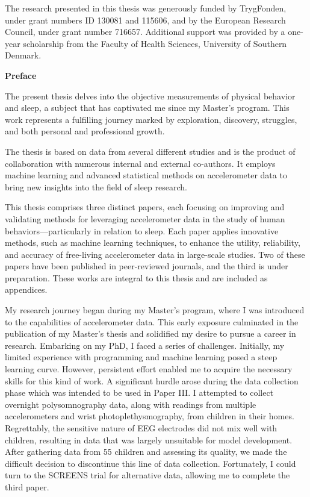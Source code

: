\documentclass[
  10pt,
]{scrbook}
\let\originaltextbf\textbf
\renewcommand{\textbf}[1]{\textcolor{color1}{\textsf{\originaltextbf{#1}}}}
\begin{document}
\vspace*{\baselineskip}

The research presented in this thesis was generously funded by TrygFonden, under grant numbers ID 130081 and 115606, and by the European Research Council, under grant number 716657. Additional support was provided by a one-year scholarship from the Faculty of Health Sciences, University of Southern Denmark.

\newpage

  
\textcolor{color1}{\textsf{\textbf{\Large{Preface}}}}

\vspace*{\baselineskip}

The present thesis delves into the objective measurements of physical behavior and sleep, a subject that has captivated me since my Master's program. This work represents a fulfilling journey marked by exploration, discovery, struggles, and both personal and professional growth.

The thesis is based on data from several different studies and is the product of collaboration with numerous internal and external co-authors. It employs machine learning and advanced statistical methods on accelerometer data to bring new insights into the field of sleep research.

This thesis comprises three distinct papers, each focusing on improving and validating methods for leveraging accelerometer data in the study of human behaviors—particularly in relation to sleep. Each paper applies innovative methods, such as machine learning techniques, to enhance the utility, reliability, and accuracy of free-living accelerometer data in large-scale studies. Two of these papers have been published in peer-reviewed journals, and the third is under preparation. These works are integral to this thesis and are included as appendices.

My research journey began during my Master's program, where I was introduced to the capabilities of accelerometer data. This early exposure culminated in the publication of my Master's thesis and solidified my desire to pursue a career in research. Embarking on my PhD, I faced a series of challenges. Initially, my limited experience with programming and machine learning posed a steep learning curve. However, persistent effort enabled me to acquire the necessary skills for this kind of work. A significant hurdle arose during the data collection phase which was intended to be used in Paper III. I attempted to collect overnight polysomnography data, along with readings from multiple accelerometers and wrist photoplethysmography, from children in their homes. Regrettably, the sensitive nature of EEG electrodes did not mix well with children, resulting in data that was largely unsuitable for model development. After gathering data from 55 children and assessing its quality, we made the difficult decision to discontinue this line of data collection. Fortunately, I could turn to the SCREENS trial for alternative data, allowing me to complete the third paper.
\end{document}
